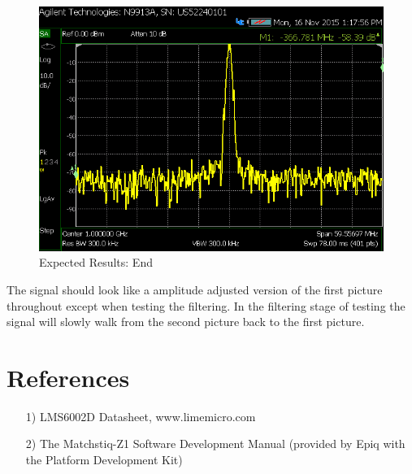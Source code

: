 \documentclass{article}
\begin{document}
\begin{flushleft}
\begin{figure}[ht]
		\centerline{\includegraphics[scale=0.7]{YesFilter}}
		\caption{Expected Results: End}
		\label{fig:tb2}
	\end{figure}

	\vspace{15 mm}

	\noindent The signal should look like a amplitude adjusted version of the first picture throughout except when testing the filtering.  In the filtering stage of testing the signal will slowly walk from the second picture back to the first picture.
\end{flushleft}

\section*{References}
\begin{itemize}
	\item[1)] LMS6002D Datasheet, www.limemicro.com
	\item[2)] The Matchstiq-Z1 Software Development Manual (provided by Epiq with the Platform Development Kit)
\end{itemize}
\end{document}
